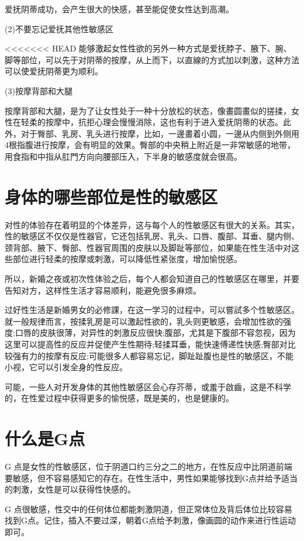 \documentclass[12pt,UTF8]{ctexbook}
\begin{document}
爱抚阴蒂成功，会产生很大的快感，甚至能促使女性达到高潮。

(2)不要忘记爱抚其他性敏感区

<<<<<<< HEAD
能够激起女性性欲的另外一种方式是爱抚脖子、腋下、腕、脚等部位，可以先于对阴蒂的按摩，从上而下，以直線的方式加以刺激，这种方法可以使爱抚阴蒂更为顺利。

(3)按摩背部和大腿

按摩背部和大腿，是为了让女性处于一种十分放松的状态，像畫圆畫似的搓揉，女性在轻柔的按摩中，抗拒心理会慢慢消除，这也有利于进入爱抚阴蒂的状态。此外，对于臀部、乳房、乳头进行按摩，比如，一邊畫着小圆，一邊从内侧到外侧用4根指腹进行按摩，会有明显的效果。臀部的中央稍上附近是一非常敏感的地带，用食指和中指从肛門方向向腰部压入，下半身的敏感度就会很高。

\section{身体的哪些部位是性的敏感区}

对性的体验存在着明显的个体差异，这与每个人的性敏感区有很大的关系。其实，性的敏感区不仅仅是性器官，它还包括乳房、乳头、口唇、腹部、耳垂、腿内侧、颈背部、腋下、臀部、性器官周围的皮肤以及脚趾等部位，如果能在性生活中对这些部位进行轻柔的按摩或刺激，可以降低性紧张度，增加愉悦感。

所以，新婚之夜或初次性体验之后，每个人都会知道自己的性敏感区在哪里，并要告知对方，这样性生活才容易顺利，能避免很多麻烦。

过好性生活是新婚男女的必修課，在这一学习的过程中，可以嘗試多个性敏感区。就一般规律而言，按揉乳房是可以激起性欲的，乳头则更敏感，会增加性欲的强度;口唇的皮肤很薄，对异性的刺激反应很快;腹部，尤其是下腹部不容忽视，因为这里可以提高性的反应并促使产生性期待;轻揉耳垂，能快速傅递性快感;臀部对比较强有力的按摩有反应;可能很多人都容易忘记，脚趾趾腹也是性的敏感区，不能小视，它可以引发全身的性反应。

可能，一些人对开发身体的其他性敏感区会心存芥蒂，或羞于啟齒，这是不科学的，在性爱过程中获得更多的愉悦感，既是美的，也是健康的。

\section{什么是G点}

G 点是女性的性敏感区，位于阴道口约三分之二的地方，在性反应中比阴道前端要敏感，但不容易感知它的存在。在性生活中，男性如果能够找到G点并给予适当的刺激，女性是可以获得性快感的。

G 点很敏感，性交中的任何体位都能刺激阴道，但正常体位及背后体位比较容易找到G点。记住，插入不要过深，朝着G点给予刺激，像画圆的动作来进行性运动即可。
\end{document}
